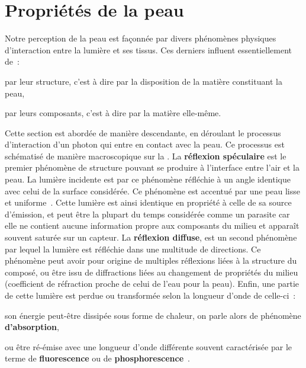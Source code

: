 \section{Propriétés de la peau}
Notre perception de la peau est façonnée par divers phénomènes physiques d'interaction entre la lumière et ses tissus. Ces derniers influent essentiellement de~: 
\begin{inlinerate}
    \item par leur structure, c'est à dire par la disposition de la matière constituant la peau,
    \item par leurs composants, c'est à dire par la matière elle-même.
\end{inlinerate}
Cette section est abordée de manière descendante, en déroulant le processus d'interaction d'un photon qui entre en contact avec la peau. Ce processus est schématisé de manière macroscopique sur la . La \textbf{réflexion spéculaire} est le premier phénomène de structure pouvant se produire à l'interface entre l'air et la peau. La lumière incidente est par ce phénomène réfléchie à un angle identique avec celui de la surface considérée. Ce phénomène est accentué par une peau lisse et uniforme~\cite{Yang2009}. Cette lumière est ainsi identique en propriété à celle de sa source d'émission, et peut être la plupart du temps considérée comme un parasite car elle ne contient aucune information propre aux composants du milieu et apparaît souvent saturée sur un capteur. La \textbf{réflexion diffuse}, est un second phénomène par lequel la lumière est réfléchie dans une multitude de directions. Ce phénomène peut avoir pour origine de multiples réflexions liées à la structure du composé, ou être issu de diffractions liées au changement de propriétés du milieu~\cite{Yang2009} (coefficient de réfraction proche de celui de l'eau pour la peau). Enfin, une partie de cette lumière est perdue ou transformée selon la longueur d'onde de celle-ci~:
\begin{inlinerate}
    \item son énergie peut-être dissipée sous forme de chaleur, on parle alors de phénomène \textbf{d'absorption},
    \item ou être ré-émise avec une longueur d'onde différente souvent caractérisée par le terme de \textbf{fluorescence} ou de \textbf{phosphorescence}~\cite{Kollias2002}.
\end{inlinerate}\par

